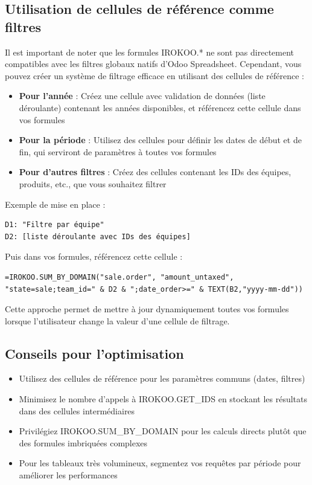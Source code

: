 \documentclass[12pt, a4paper]{article}
\begin{document}
\subsection{Utilisation de cellules de référence comme filtres}

Il est important de noter que les formules IROKOO.* ne sont pas directement compatibles avec les filtres globaux natifs d'Odoo Spreadsheet. Cependant, vous pouvez créer un système de filtrage efficace en utilisant des cellules de référence :

\begin{itemize}
    \item \textbf{Pour l'année} : Créez une cellule avec validation de données (liste déroulante) contenant les années disponibles, et référencez cette cellule dans vos formules
    \item \textbf{Pour la période} : Utilisez des cellules pour définir les dates de début et de fin, qui serviront de paramètres à toutes vos formules
    \item \textbf{Pour d'autres filtres} : Créez des cellules contenant les IDs des équipes, produits, etc., que vous souhaitez filtrer
\end{itemize}

Exemple de mise en place :
\begin{lstlisting}
D1: "Filtre par équipe"
D2: [liste déroulante avec IDs des équipes]
\end{lstlisting}

Puis dans vos formules, référencez cette cellule :
\begin{lstlisting}
=IROKOO.SUM_BY_DOMAIN("sale.order", "amount_untaxed", "state=sale;team_id=" & D2 & ";date_order>=" & TEXT(B2,"yyyy-mm-dd"))
\end{lstlisting}

Cette approche permet de mettre à jour dynamiquement toutes vos formules lorsque l'utilisateur change la valeur d'une cellule de filtrage.

\subsection{Conseils pour l'optimisation}

\begin{itemize}
    \item Utilisez des cellules de référence pour les paramètres communs (dates, filtres)
    \item Minimisez le nombre d'appels à IROKOO.GET\_IDS en stockant les résultats dans des cellules intermédiaires
    \item Privilégiez IROKOO.SUM\_BY\_DOMAIN pour les calculs directs plutôt que des formules imbriquées complexes
    \item Pour les tableaux très volumineux, segmentez vos requêtes par période pour améliorer les performances
\end{itemize}
\end{document}
